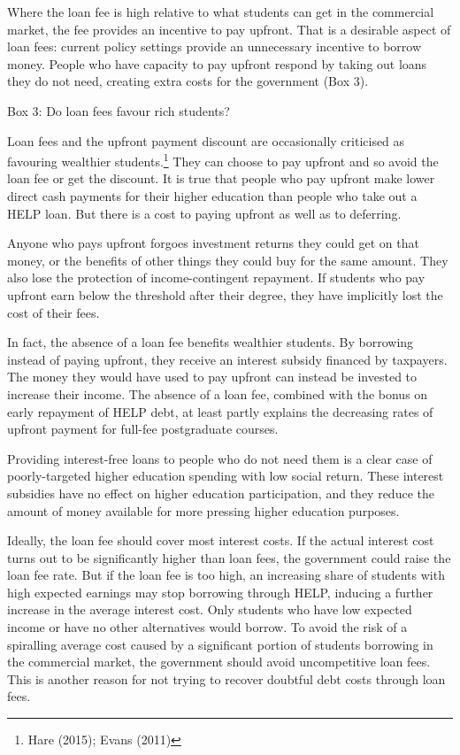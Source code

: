 \documentclass[]{book}
\begin{document}
Where the loan fee is high relative to what students can get in the commercial market, the fee provides an incentive to pay upfront. That is a desirable aspect of loan fees: current policy settings provide an unnecessary incentive to borrow money. People who have capacity to pay upfront respond by taking out loans they do not need, creating extra costs for the government (Box 3).

\protect\hypertarget{_Ref334786940}{}{}Box 3: Do loan fees favour rich students?

Loan fees and the upfront payment discount are occasionally criticised as favouring wealthier students.\footnote{Hare (2015); Evans (2011)} They can choose to pay upfront and so avoid the loan fee or get the discount. It is true that people who pay upfront make lower direct cash payments for their higher education than people who take out a HELP loan. But there is a cost to paying upfront as well as to deferring.

Anyone who pays upfront forgoes investment returns they could get on that money, or the benefits of other things they could buy for the same amount. They also lose the protection of income-contingent repayment. If students who pay upfront earn below the threshold after their degree, they have implicitly lost the cost of their fees.

In fact, the absence of a loan fee benefits wealthier students. By borrowing instead of paying upfront, they receive an interest subsidy financed by taxpayers. The money they would have used to pay upfront can instead be invested to increase their income. The absence of a loan fee, combined with the bonus on early repayment of HELP debt, at least partly explains the decreasing rates of upfront payment for full-fee postgraduate courses.

Providing interest-free loans to people who do not need them is a clear case of poorly-targeted higher education spending with low social return. These interest subsidies have no effect on higher education participation, and they reduce the amount of money available for more pressing higher education purposes.

Ideally, the loan fee should cover most interest costs. If the actual interest cost turns out to be significantly higher than loan fees, the government could raise the loan fee rate. But if the loan fee is too high, an increasing share of students with high expected earnings may stop borrowing through HELP, inducing a further increase in the average interest cost. Only students who have low expected income or have no other alternatives would borrow. To avoid the risk of a spiralling average cost caused by a significant portion of students borrowing in the commercial market, the government should avoid uncompetitive loan fees. This is another reason for not trying to recover doubtful debt costs through loan fees.
\end{document}
